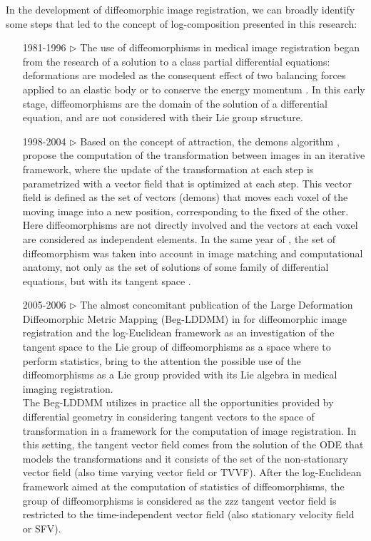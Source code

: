 In the development of diffeomorphic image registration, we can broadly identify some steps that led to the concept of log-composition presented in this research:
\begin{enumerate}
	\item[1981-1996 $\triangleright$] The use of diffeomorphisms in medical image registration began from the research of a solution to a class partial differential equations: deformations are modeled as the consequent effect of two balancing forces applied to an elastic body \cite{Broit:1981} or to conserve the energy momentum \cite{christensen1996deformable}. In this early stage, diffeomorphisms are the domain of the solution of a differential equation, and are not considered with their Lie group structure.
	\item[1998-2004 $\triangleright$] Based on the concept of attraction, the demons algorithm \cite{thirion1998image}, \cite{pennec1999understanding} propose the computation of the transformation between images in an iterative framework, where the update of the transformation at each step is parametrized with a vector field that is optimized at each step. This vector field is defined as the set of vectors (demons) that moves each voxel of the moving image into a new position, corresponding to the fixed of the other. \\
	Here diffeomorphisms are not directly involved and the vectors at each voxel are considered as independent elements. 
	In the same year of \cite{thirion1998image}, the set of diffeomorphism was taken into account in image matching and computational anatomy, not only as the set of solutions of some family of differential equations, but with its tangent space \cite{Dupuis:98:variationalproblems,  trouve1998diffeomorphisms, grenander1998computational}.
	\item[2005-2006 $\triangleright$] The almost concomitant publication of the Large Deformation Diffeomorphic Metric Mapping (Beg-LDDMM) in \cite{beg2005computing} for diffeomorphic image registration and the log-Euclidean framework \cite{arsigny2006statistics, Arsigny:MRM:06}  as an investigation of the tangent space to the Lie group of diffeomorphisms as a space where to perform statistics,
	bring to the attention the possible use of the diffeomorphisms as a Lie group provided with its Lie algebra in medical imaging registration.\\
	The Beg-LDDMM utilizes in practice all the opportunities provided by differential geometry in considering tangent vectors to the space of transformation in a framework for the computation of image registration. In this setting, the tangent vector field comes from the solution of the ODE that models the transformations and it consists of the set of the non-stationary vector field (also time varying vector field or TVVF). After the log-Euclidean framework \cite{arsigny2006statistics} aimed at the computation of statistics of diffeomorphisms, the group of diffeomorphisms is considered as the zzz tangent vector field is restricted to the time-independent vector field (also stationary velocity field or SFV).

\end{enumerate}
